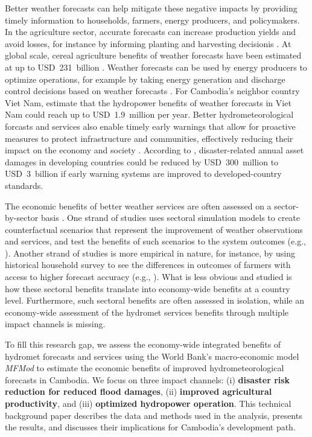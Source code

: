 \documentclass[
  final,
  10pt,
  letterpaper,
  english,
]{article}
\begin{document}
Better weather forecasts can help mitigate these negative impacts by providing
timely information to households, farmers, energy producers, and policymakers.
In the agriculture sector, accurate forecasts can increase production yields and
avoid losses, for instance by informing planting and harvesting decisionis
\parencite{an-vo_framework_2021}. At global scale, cereal agriculture benefits
of weather forecasts have been estimated at up to USD~231~billion
\parencite{farkas2025economic}. Weather forecasts can be used by energy
producers to optimize operations, for example by taking energy generation and
discharge control decisions based on weather forecasts
\parencite{koh_evaluating_2024}. For Cambodia's neighbor country Viet Nam,
\textcite{giuliani2015making} estimate that the hydropower benefits of weather
forecasts in Viet Nam could reach up to USD~1.9~million per year. Better
hydrometeorological forcasts and services also enable timely early warnings that
allow for proactive measures to protect infrastructure and communities,
effectively reducing their impact on the economy and society
\parencite{middelanis2025warning}. According to \textcite{hallegatte_cost_2012},
disaster-related annual asset damages in developing countries could be reduced
by USD~300~million to USD~3~billion if early warning systems are improved to
developed-country standards.

The economic benefits of better weather services are often assessed on a
sector-by-sector basis \parencite{farkas2025economic}. One strand of studies
uses sectoral simulation models to create counterfactual scenarios that
represent the improvement of weather observations and services, and test the
benefits of such scenarios to the system outcomes (e.g.,
\cite{koh_evaluating_2024,pappenberger2015monetary}). Another strand of studies
is more empirical in nature, for instance, by using historical household survey
to see the differences in outcomes of farmers with access to higher forecast
accuracy (e.g., \cite{amegnaglo2022use,dupdal2020farmers}). What is less
obvious and studied is how these sectoral benefits translate into economy-wide
benefits at a country level. Furthermore, such sectoral benefits are often
assessed in isolation, while an economy-wide assessment of the hydromet services
benefits through multiple impact channels is missing.

To fill this research gap, we assess the economy-wide integrated benefits of
hydromet forecasts and services using the World Bank's macro-economic model
\textit{MFMod} \parencite{burns_world_2019} to estimate the economic benefits of
improved hydrometeorological forecasts in Cambodia. We focus on three impact
channels: (i) \textbf{disaster risk reduction for reduced flood damages}, (ii)
\textbf{improved agricultural productivity}, and (iii) \textbf{optimized
hydropower operation}. This technical background paper describes the data and
methods used in the analysis, presents the results, and discusses their
implications for Cambodia's development path.
\end{document}
